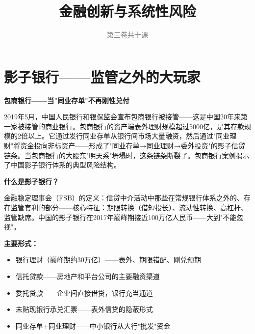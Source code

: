 \documentclass[a4paper,11pt]{ctexbook}
\title{\textcolor{themeblue}{\Huge\textbf{金融创新与系统性风险}}}
\subtitle{\textcolor{gray}{第三卷\quad 共十课}}
\author{}
\date{}
\begin{document}
\maketitle
\thispagestyle{empty}
\tableofcontents
\newpage

\chapter{影子银行——监管之外的大玩家}

\begin{scenario}
\textbf{包商银行——当"同业存单"不再刚性兑付}

2019年5月，中国人民银行和银保监会宣布包商银行被接管——这是中国20年来第一家被接管的商业银行。包商银行的资产端表外理财规模超过5000亿，是其存款规模的2倍以上。它通过发行同业存单从银行间市场大量融资，然后通过"同业理财"将资金投向非标资产——形成了"同业存单→同业理财→委外投资"的影子信贷链条。当包商银行的大股东"明天系"坍塌时，这条链条断裂了。包商银行案例揭示了中国影子银行体系的典型风险结构。
\end{scenario}

\begin{qualitative}
\textbf{什么是影子银行？}

金融稳定理事会（FSB）的定义：信贷中介活动中那些在常规银行体系之外的、存在监管套利的部分——核心特征：期限转换（借短投长）、流动性转换、高杠杆、监管缺席。中国的影子银行在2017年巅峰期接近100万亿人民币——大到"不能忽视"。

\textbf{主要形式：}
\begin{itemize}
  \item 银行理财（巅峰期约30万亿）——表外、期限错配、刚兑预期
  \item 信托贷款——房地产和平台公司的主要融资渠道
  \item 委托贷款——企业间直接借贷，银行充当通道
  \item 未贴现银行承兑汇票——表外信贷的隐蔽形式
  \item 同业存单+同业理财——中小银行从大行"批发"资金
\end{itemize}
\end{qualitative}
\end{document}
